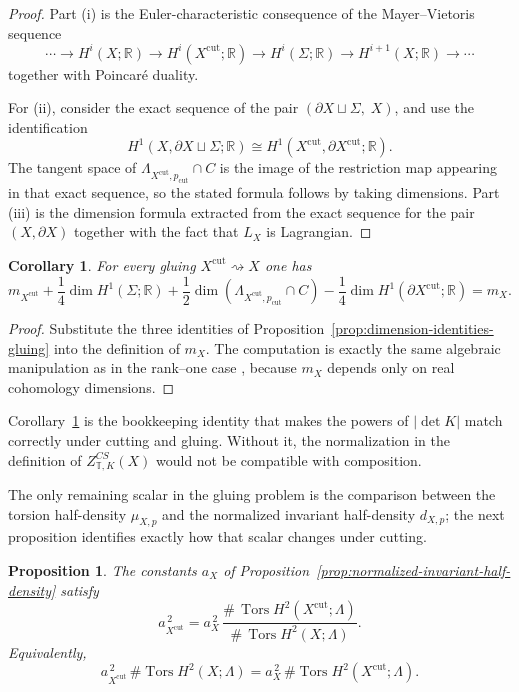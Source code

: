 \documentclass[12pt]{amsart}
\numberwithin{equation}{section}
\newtheorem{prop}[theorem]{Proposition}
\newtheorem{corollary}[theorem]{Corollary}
\DeclareMathOperator{\Tors}{Tors}
\begin{document}
\begin{proof}
Part \textup{(i)} is the Euler-characteristic consequence of the Mayer--Vietoris
sequence
\[
\cdots\to H^i(X;\mathbb R)\to H^i(X^{\mathrm{cut}};\mathbb R)\to
H^i(\Sigma;\mathbb R)\to H^{i+1}(X;\mathbb R)\to\cdots
\]
together with Poincar\'e duality.

For \textup{(ii)}, consider the exact sequence of the pair $(\partial X\sqcup \Sigma,\;X)$, and use the identification
\[
H^1(X,\partial X\sqcup \Sigma;\mathbb R)
\cong
H^1(X^{\mathrm{cut}},\partial X^{\mathrm{cut}};\mathbb R).
\]
The tangent space of $\Lambda_{X^{\mathrm{cut}},p_{\mathrm{cut}}}\cap C$ is the image
of the restriction map appearing in that exact sequence, so the stated formula
follows by taking dimensions. Part \textup{(iii)} is the dimension formula extracted from the exact sequence
for the pair $(X,\partial X)$ together with the fact that $L_X$ is Lagrangian.
\end{proof}

\begin{corollary}
\label{cor:exponent-identity}
For every gluing $X^{\mathrm{cut}}\rightsquigarrow X$ one has
\[
m_{X^{\mathrm{cut}}}
+\frac14\dim H^1(\Sigma;\mathbb R)
+\frac12\dim(\Lambda_{X^{\mathrm{cut}},p_{\mathrm{cut}}}\cap C)
-\frac14\dim H^1(\partial X^{\mathrm{cut}};\mathbb R)
=
m_X.
\]
\end{corollary}

\begin{proof}
Substitute the three identities of
Proposition~\ref{prop:dimension-identities-gluing}
into the definition of $m_X$.
The computation is exactly the same algebraic manipulation as in the rank--one case \cite{Manoliu2},
because $m_X$ depends only on real cohomology dimensions.
\end{proof}

Corollary~\ref{cor:exponent-identity} is the bookkeeping identity that makes the powers of \(|\det K|\) match correctly under cutting and gluing. Without it, the
normalization in the definition of \(Z^{CS}_{\mathbb T,K}(X)\) would not be compatible with composition.

The only remaining scalar in the gluing problem is the comparison between the torsion half-density
$\mu_{X,p}$ and the normalized invariant half-density $d_{X,p}$; the next proposition identifies exactly how
that scalar changes under cutting.
\begin{prop}
\label{prop:scalar-normalization-half-densities}
The constants $a_X$ of Proposition~\ref{prop:normalized-invariant-half-density}
satisfy
\[
a_{X^{\mathrm{cut}}}^{\,2}
=
a_X^{\,2}\,
\frac{\#\,\Tors H^2(X^{\mathrm{cut}};\Lambda)}
{\#\,\Tors H^2(X;\Lambda)}.
\]
Equivalently,
\[
a_{X^{\mathrm{cut}}}^{\,2}\,
\#\operatorname{Tors}H^2(X;\Lambda)
=
a_X^{\,2}\,
\#\operatorname{Tors}H^2(X^{\mathrm{cut}};\Lambda).
\]
\end{prop}
\end{document}
